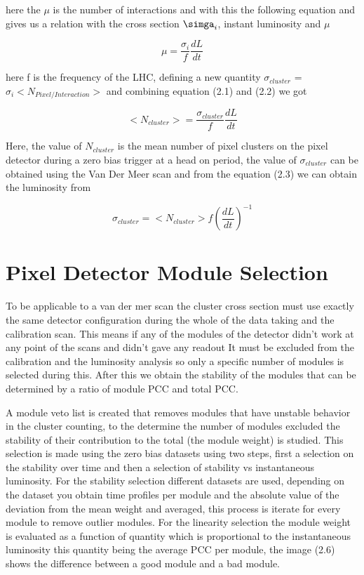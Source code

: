 here the $\mu$ is the number of interactions and with this the following equation and gives us a relation with the cross section $\simga_{i}$, instant luminosity and $\mu$

\begin{equation}
\mu = \frac{\sigma_{i}}{f}\frac{dL}{dt}
\end{equation}

here f is the frequency of the LHC, defining a new quantity $\sigma_{cluster}$ = $\sigma_{i}<N_{Pixel/Interaction}> $ and combining equation (2.1) and (2.2) we got

\begin{equation}
<N_{cluster}> = \frac{\sigma_{cluster}}{f} \frac{dL}{dt}
\end{equation}

Here, the value of $N_{cluster}$ is the mean number of pixel clusters on the pixel detector during a zero bias trigger at a head on period, the value of $\sigma_{cluster}$ can be obtained using the Van Der Meer scan and from the equation (2.3) we can obtain the luminosity from \cite{PCC2}

\begin{equation}
\sigma_{cluster} = <N_{cluster}> f (\frac{dL}{dt})^{-1}
\end{equation} 


\section{Pixel Detector Module Selection}

To be applicable to a van der mer scan the cluster cross section must use exactly the same detector configuration during the whole of the data taking and the calibration scan. This means if any of the modules of the detector didn't work at any point of the scans and didn't gave any readout It must be excluded from the calibration and the luminosity analysis so only a specific number of modules is selected during this. After this we obtain the stability of the modules that can be determined by a ratio of module PCC and total PCC. \cite{PCC3}

A module veto list is created that removes modules that have unstable behavior in the cluster counting, to the determine the number of modules excluded the stability of their contribution to the total (the module weight) is studied. This selection is made using the zero bias datasets using two steps, first a selection on the stability over time and then a selection of stability vs instantaneous luminosity. For the stability selection different datasets are used, depending on the dataset you obtain time profiles per module and the absolute value of the deviation from the mean weight and averaged, this process is iterate for every module to remove outlier modules. For the linearity selection the module weight is evaluated as a function of quantity which is proportional to the instantaneous luminosity this quantity being the average PCC per module, the image (2.6) shows the difference between a good module and a bad module. 

